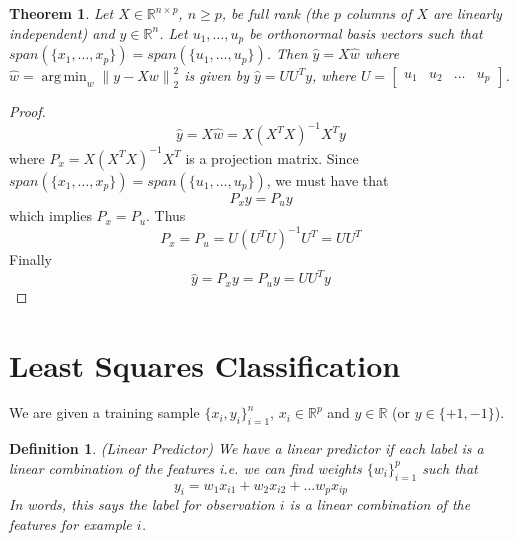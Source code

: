 \documentclass[12pt]{article}
\newtheorem{theorem}{Theorem}
\newtheorem{definition}{Definition}
\theoremstyle{definition}
\DeclareMathOperator*{\argmin}{arg\,min}
\newcommand{\R}{\mathbb{R}}
\newcommand{\norm}[1]{\left\lVert#1\right\rVert}
\begin{document}
\begin{theorem}
Let $X \in \R^{n \times p}$, $n\geq p$, be full rank (the $p$ columns of $X$ are linearly independent) and $y \in \R^n$. Let $u_1, \ldots, u_p$ be orthonormal basis vectors such that $span(\{x_1, \ldots, x_p\}) = span(\{u_1, \ldots, u_p \})$. Then $\hat y = X \hat w$ where $\hat w = \argmin_w \norm{y - Xw}_2^2$ is given by $\hat y = UU^T y$, where $U = \begin{bmatrix} u_1 &u_2 & \hdots & u_p \end{bmatrix}$.
\end{theorem}
\begin{proof}
\begin{equation}
	\hat y = X \hat w = X (X^T X)^{-1} X^T y
\end{equation}
where $P_x = X (X^T X)^{-1} X^T$ is a projection matrix. Since $span(\{x_1, \ldots, x_p\}) = span(\{u_1, \ldots, u_p \})$, we must have that 
\begin{equation}
	P_x y = P_u y
\end{equation}
which implies $P_x = P_u$. Thus
\begin{equation}
	P_x = P_u = U (U^T U)^{-1} U^T = U U^T
\end{equation}
Finally
\begin{equation}
	\hat y = P_x y = P_u y = UU^T y
\end{equation}
\end{proof}

\section{Least Squares Classification}
We are given a training sample $\{x_i, y_i \}_{i=1}^n$, $x_i \in \R^p$ and $y\in \R$ (or $y \in \{+1,-1\}$).

\begin{definition}(Linear Predictor)
We have a linear predictor if each label is a linear combination of the features i.e. we can find weights $\{w_i\}_{i=1}^{p}$ such that
\begin{equation}
y_i = w_1 x_{i1} + w_2 x_{i2} + \ldots w_p x_{ip}
\end{equation}
In words, this says the label for observation $i$ is a linear combination of the features for example $i$. 
\end{definition}
\end{document}
